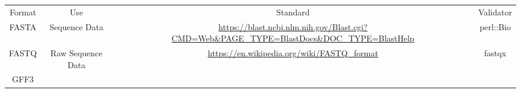 \begin{tabular}{cccc}
{Format} & {Use} & {Standard} & {Validator} \\
FASTA & Sequence Data & \url{https://blast.ncbi.nlm.nih.gov/Blast.cgi?CMD=Web&PAGE_TYPE=BlastDocs&DOC_TYPE=BlastHelp} & perl::Bio \\
FASTQ & Raw Sequence Data & \url{https://en.wikipedia.org/wiki/FASTQ_format} & fastqx \\
GFF3 
\end{tabular}
